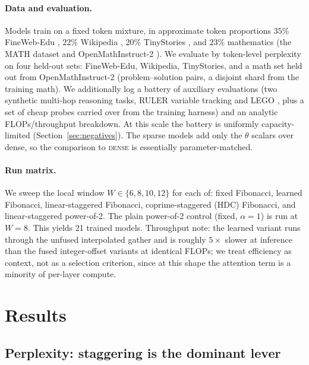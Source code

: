 \documentclass[11pt]{article}
\begin{document}
\paragraph{Data and evaluation.}
Models train on a fixed token mixture, in approximate token proportions $35\%$
FineWeb-Edu \citep{penedo2024fineweb}, $22\%$ Wikipedia \citep{wikidump}, $20\%$
TinyStories \citep{eldan2023tinystories}, and $23\%$ mathematics (the MATH dataset
\citep{hendrycks2021math} and OpenMathInstruct-2
\citep{toshniwal2024openmathinstruct}). We evaluate by token-level perplexity on
four held-out sets: FineWeb-Edu, Wikipedia, TinyStories, and a math set held out
from OpenMathInstruct-2 (problem--solution pairs, a disjoint shard from the
training math).
We additionally log a battery of auxiliary evaluations (two synthetic multi-hop
reasoning tasks, RULER variable tracking \citep{hsieh2024ruler} and LEGO
\citep{zhang2022lego}, plus a set of cheap probes carried over from the training
harness) and an analytic FLOPs/throughput breakdown. At this scale the battery is
uniformly capacity-limited (Section~\ref{sec:negatives}). The sparse models add only the $\theta$
scalars over dense, so the comparison to \textsc{dense} is essentially
parameter-matched.

\paragraph{Run matrix.}
We sweep the local window $W \in \{6,8,10,12\}$ for each of: fixed Fibonacci,
learned Fibonacci, linear-staggered Fibonacci, coprime-staggered (HDC)
Fibonacci, and linear-staggered power-of-2. The plain power-of-2 control (fixed,
$\alpha=1$) is run at $W=8$. This yields 21 trained models. Throughput note: the
learned variant runs through the unfused interpolated gather and is roughly
$5\times$ slower at inference than the fused integer-offset variants at identical
FLOPs; we treat efficiency as context, not as a selection criterion, since at
this shape the attention term is a minority of per-layer compute.

\section{Results}
\label{sec:results}

\subsection{Perplexity: staggering is the dominant lever}
\end{document}
